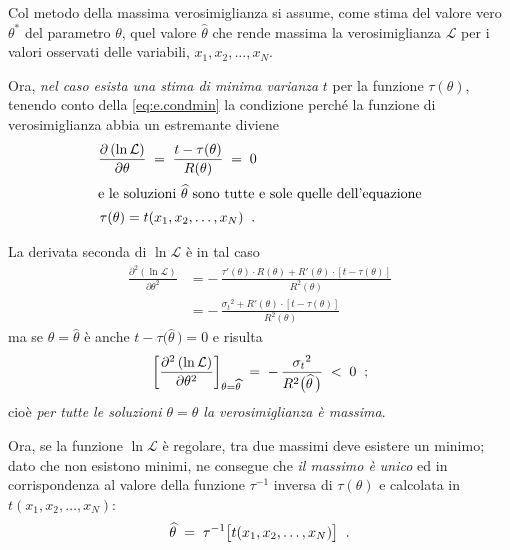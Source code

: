 %
Col metodo della massima verosimiglianza si assume, come
stima del valore vero $\theta^*$ del parametro $\theta$,
quel valore $\widehat \theta$ che rende massima la
verosimiglianza $\mathcal{L}$ per i valori osservati delle
variabili, $x_1, x_2,\ldots, x_N$.

Ora, \emph{nel caso esista una stima di minima varianza} $t$
per la funzione $\tau(\theta)$, tenendo conto della
\eqref{eq:e.condmin} la condizione perch\'e la funzione di
verosimiglianza abbia un estremante diviene
\begin{gather*}
  \frac{\partial \left( \ln \mathcal{L} \right)}
    {\partial \theta} \; = \;
    \frac{t - \tau(\theta)}{R(\theta)}
    \; = \; 0 \\
    \intertext{e le soluzioni $\widehat \theta$ sono
      tutte e sole quelle dell'equazione}
  \tau(\theta) = t(x_1,x_2,\ldots,x_N) \peq .
\end{gather*}

La derivata seconda di $\ln \mathcal{L}$ \`e in tal caso
\begin{align*}
  \frac{\partial^2 \left( \ln \mathcal{L} \right)}
    {\partial \theta^2} &=
    - \, \frac{\tau ' (\theta) \cdot
    R(\theta) + R'(\theta) \cdot
    \left[ t - \tau(\theta) \right] }
    { R^2(\theta) } \\[1ex]
  &= - \, \frac{ {\sigma_t}^2 +
    R'(\theta) \cdot \left[
    t - \tau(\theta) \right] }
    { R^2(\theta) }
\end{align*}
ma se $\theta = \widehat \theta$ \`e anche $t - \tau \bigl(
\widehat \theta \, \bigr) = 0$ e risulta
\begin{equation*}
  \left[ \frac{\partial^2 \left( \ln \mathcal{L}
     \right)}{\partial \theta^2}
     \right]_{\theta = \widehat \theta} \; = \;
     - \, \frac{ {\sigma_t}^2 }
     {R^2 \bigl ( \widehat \theta \, \bigr )}
     \; < \; 0 \;\; ;
\end{equation*}
cio\`e \emph{per tutte le soluzioni $\theta = \widehat
  \theta$ la verosimiglianza \`e massima}.

Ora, se la funzione $\ln \mathcal{L}$ \`e regolare, tra due
massimi deve esistere un minimo; dato che non esistono
minimi, ne consegue che \emph{il massimo \`e unico} ed in
corrispondenza al valore della funzione $\tau^{-1}$ inversa
di $\tau(\theta)$ e calcolata in $t(x_1,x_2,\ldots,x_N)$:
\begin{equation*}
  \widehat \theta \; = \; \tau^{-1} \bigl [
    t(x_1,x_2,\ldots,x_N) \bigr ] \peq .
\end{equation*}%
%

